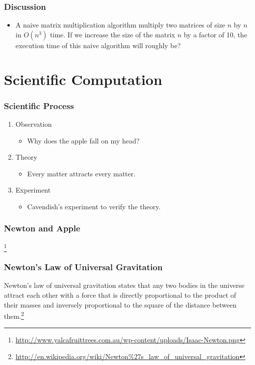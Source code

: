 \documentclass{beamer}
\begin{document}
\begin{CJK}{UTF8}{bsmi}
  \begin{frame}
    \frametitle{Discussion} 
    \begin{itemize}
    \item A naive matrix multiplication algorithm multiply two matrices of
      size $n$ by $n$ in $O(n^3)$ time.  If we increase the size of the
      matrix $n$ by a factor of 10, the execution time of this naive
      algorithm will roughly be?
    \end{itemize}
  \end{frame}

  \section{Scientific Computation}

  \begin{frame}
    \frametitle{Scientific Process} 
    \begin{enumerate}
    \item Observation
      \begin{itemize}
      \item Why does the apple fall on my head?
      \end{itemize}
    \item Theory
      \begin{itemize}
      \item Every matter attracts every matter.
      \end{itemize}
    \item Experiment
      \begin{itemize}
      \item Cavendish's experiment to verify the theory.
      \end{itemize}
    \end{enumerate}
  \end{frame}

  \begin{frame}
    \frametitle{Newton and Apple}
    \centerline{}\footnote{\url{http://www.yalcafruittrees.com.au/wp-content/uploads/Isaac-Newton.png}}
  \end{frame}

  \begin{frame}
    \frametitle{Newton's Law of Universal Gravitation} Newton's law of
    universal gravitation states that any two bodies in the universe
    attract each other with a force that is directly proportional to the
    product of their masses and inversely proportional to the square of
    the distance between them.\footnote{\url{http://en.wikipedia.org/wiki/Newton\%27s_law_of_universal_gravitation}}
  \end{frame}


\end{CJK}
\end{document}
